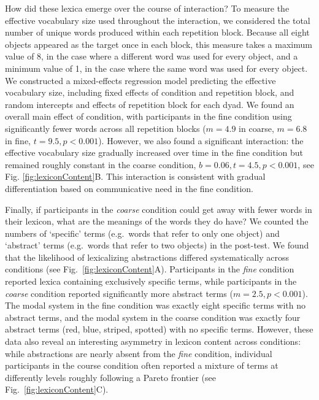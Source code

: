 How did these lexica emerge over the course of interaction? 
To measure the effective vocabulary size used throughout the interaction, we considered the total number of unique words produced within each repetition block.
Because all eight objects appeared as the target once in each block, this measure takes a maximum value of 8, in the case where a different word was used for every object, and a minimum value of 1, in the case where the same word was used for every object.
We constructed a mixed-effects regression model predicting the effective vocabulary size, including fixed effects of condition and repetition block, and random intercepts and effects of repetition block for each dyad. 
We found an overall main effect of condition, with participants in the fine condition using significantly fewer words across all repetition blocks ($m = 4.9$ in coarse, $m=6.8$ in fine, $t = 9.5, p < 0.001$).
However, we also found a significant interaction: the effective vocabulary size gradually increased over time in the fine condition but remained roughly constant in the coarse condition, $b = 0.06, t = 4.5, p < 0.001$, see Fig. \ref{fig:lexiconContent}B.
This interaction is consistent with gradual differentiation based on communicative need in the fine condition.

Finally, if participants in the \emph{coarse} condition could get away with fewer words in their lexicon, what are the meanings of the words they do have? 
We counted the numbers of `specific' terms (e.g.\ words that refer to only one object) and `abstract' terms (e.g.\ words that refer to two objects) in the post-test. 
We found that the likelihood of lexicalizing abstractions differed systematically across conditions (see Fig.\ \ref{fig:lexiconContent}A). 
Participants in the \emph{fine} condition reported lexica containing exclusively specific terms, while participants in the \emph{coarse} condition reported significantly more abstract terms ($m = 2.5, p < 0.001$). 
The modal system in the fine condition was exactly eight specific terms with no abstract terms, and the modal system in the coarse condition was exactly four abstract terms (red, blue, striped, spotted) with no specific terms.
However, these data also reveal an interesting asymmetry in lexicon content across conditions: while abstractions are nearly absent from the \emph{fine} condition, individual participants in the course condition often reported a mixture of terms at differently levels roughly following a Pareto frontier (see Fig.\ \ref{fig:lexiconContent}C).

